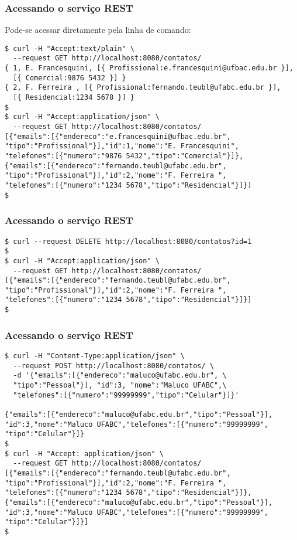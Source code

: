 \documentclass[Ligatures=TeX,table,brazil,svgnames,usetotalslideindicator,comp
ress,10pt]{beamer}
\begin{document}
\begin{frame}[fragile]
  \frametitle{Acessando o serviço REST}
  Pode-se acessar diretamente pela linha de comando:
{\footnotesize
  \begin{verbatim}
$ curl -H "Accept:text/plain" \
  --request GET http://localhost:8080/contatos/
{ 1, E. Francesquini, [{ Profissional:e.francesquini@ufbac.edu.br }],
  [{ Comercial:9876 5432 }] }
{ 2, F. Ferreira , [{ Profissional:fernando.teubl@ufabc.edu.br }],
  [{ Residencial:1234 5678 }] }
$
$ curl -H "Accept:application/json" \
  --request GET http://localhost:8080/contatos/
[{"emails":[{"endereco":"e.francesquini@ufbac.edu.br",
"tipo":"Profissional"}],"id":1,"nome":"E. Francesquini",
"telefones":[{"numero":"9876 5432","tipo":"Comercial"}]},
{"emails":[{"endereco":"fernando.teubl@ufabc.edu.br",
"tipo":"Profissional"}],"id":2,"nome":"F. Ferreira ",
"telefones":[{"numero":"1234 5678","tipo":"Residencial"}]}]
$
\end{verbatim}
}
\end{frame}

\begin{frame}[fragile]
  \frametitle{Acessando o serviço REST}
{\footnotesize
  \begin{verbatim}
$ curl --request DELETE http://localhost:8080/contatos?id=1
$
$ curl -H "Accept:application/json" \
  --request GET http://localhost:8080/contatos/
[{"emails":[{"endereco":"fernando.teubl@ufabc.edu.br",
"tipo":"Profissional"}],"id":2,"nome":"F. Ferreira ",
"telefones":[{"numero":"1234 5678","tipo":"Residencial"}]}]
$
\end{verbatim}
}
\end{frame}

\begin{frame}[fragile]
  \frametitle{Acessando o serviço REST}
{\footnotesize
\begin{verbatim}
$ curl -H "Content-Type:application/json" \
  --request POST http://localhost:8080/contatos/ \
  -d '{"emails":[{"endereco":"maluco@ufabc.edu.br", \
  "tipo":"Pessoal"}], "id":3, "nome":"Maluco UFABC",\
  "telefones":[{"numero":"99999999","tipo":"Celular"}]}'

{"emails":[{"endereco":"maluco@ufabc.edu.br","tipo":"Pessoal"}],
"id":3,"nome":"Maluco UFABC","telefones":[{"numero":"99999999",
"tipo":"Celular"}]}
$
$ curl -H "Accept: application/json" \
  --request GET http://localhost:8080/contatos/
[{"emails":[{"endereco":"fernando.teubl@ufabc.edu.br",
"tipo":"Profissional"}],"id":2,"nome":"F. Ferreira ",
"telefones":[{"numero":"1234 5678","tipo":"Residencial"}]},
{"emails":[{"endereco":"maluco@ufabc.edu.br","tipo":"Pessoal"}],
"id":3,"nome":"Maluco UFABC","telefones":[{"numero":"99999999",
"tipo":"Celular"}]}]
$
\end{verbatim}
}
\end{frame}
\end{document}

